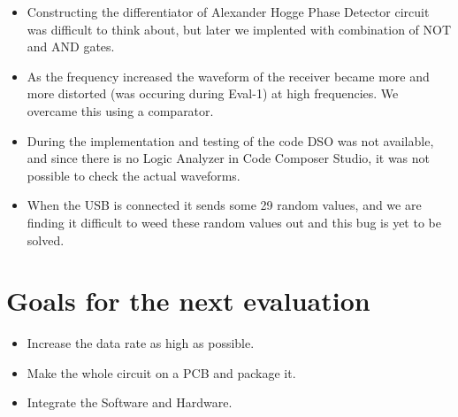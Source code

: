 \documentclass{article}
\begin{document}
\begin{itemize}
\item Constructing the differentiator of Alexander Hogge Phase Detector circuit was difficult to think about, but later we implented with combination of NOT and AND gates.
\item As the frequency increased the waveform of the receiver became more and more distorted (was occuring during Eval-1) at high frequencies. We overcame this using a comparator.
\item During the implementation and testing of the code DSO was not available, and since there is no Logic Analyzer in Code Composer Studio, it was not possible to check the actual waveforms.
\item When the USB is connected it sends some 29 random values, and we are finding it difficult to weed these random values out and this bug is yet to be solved.
\end{itemize}


\section{Goals for the next evaluation}

\begin{itemize}
\item Increase the data rate as high as possible.
\item Make the whole circuit on a PCB and package it.
\item Integrate the Software and Hardware.
\end{itemize}
\end{document}
